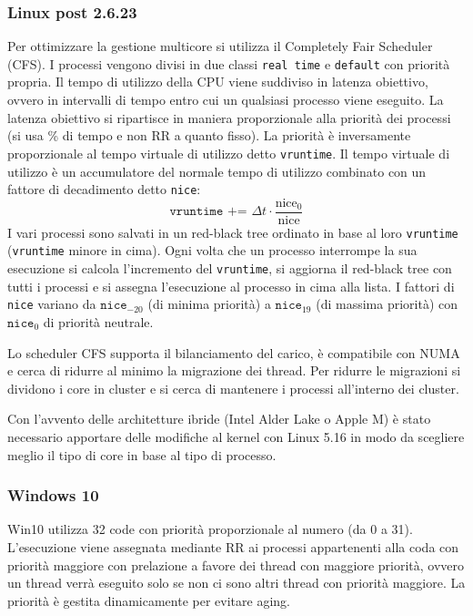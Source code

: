 \documentclass[a4paper]{article}
\begin{document}
\subsubsection*{Linux post 2.6.23}
Per ottimizzare la gestione multicore si utilizza il Completely Fair Scheduler (CFS). I processi vengono divisi in due classi
\verb|real time| e \verb|default| con priorità propria. Il tempo di utilizzo della CPU viene suddiviso in latenza obiettivo,
ovvero in intervalli di tempo entro cui un qualsiasi processo viene eseguito. La latenza obiettivo si ripartisce in maniera
proporzionale alla priorità dei processi (si usa \% di tempo e non RR a quanto fisso). La priorità è inversamente proporzionale
al tempo virtuale di utilizzo detto \verb|vruntime|. Il tempo virtuale di utilizzo è un accumulatore del normale tempo di
utilizzo combinato con un fattore di decadimento detto \verb|nice|:
\[\texttt{vruntime += } \Delta t \cdot \frac{\text{nice}_0}{\text{nice}}\]
I vari processi sono salvati in un red-black tree ordinato in base al loro \verb|vruntime| (\verb|vruntime| minore in cima).
Ogni volta che un processo interrompe la sua esecuzione si calcola l'incremento del \verb|vruntime|, si aggiorna il red-black
tree con tutti i processi e si assegna l'esecuzione al processo in cima alla lista. I fattori di \verb|nice| variano da
\(\texttt{nice}_{-20}\) (di minima priorità) a \(\texttt{nice}_{19}\) (di massima priorità) con \(\texttt{nice}_0\) di priorità
neutrale.

Lo scheduler CFS supporta il bilanciamento del carico, è compatibile con NUMA e cerca di ridurre al minimo la migrazione dei
thread. Per ridurre le migrazioni si dividono i core in cluster e si cerca di mantenere i processi all'interno dei cluster.

Con l'avvento delle architetture ibride (Intel Alder Lake o Apple M) è stato necessario apportare delle modifiche al kernel con
Linux 5.16 in modo da scegliere meglio il tipo di core in base al tipo di processo.

\subsubsection*{Windows 10}
Win10 utilizza 32 code con priorità proporzionale al numero (da 0 a 31). L'esecuzione viene assegnata mediante RR ai processi
appartenenti alla coda con priorità maggiore con prelazione a favore dei thread con maggiore priorità, ovvero un thread verrà
eseguito solo se non ci sono altri thread con priorità maggiore. La priorità è gestita dinamicamente per evitare aging.
\end{document}
